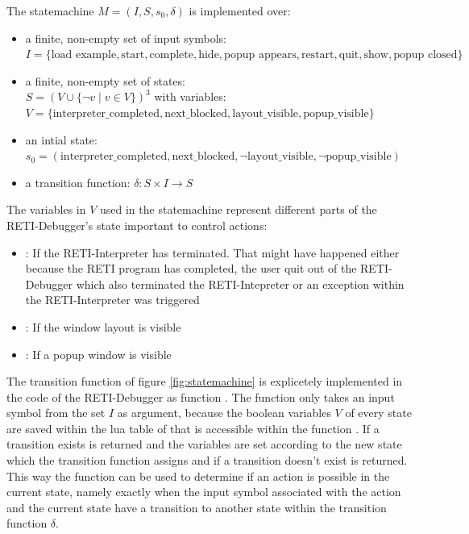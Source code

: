 \documentclass{report}
\begin{document}
The statemachine $M = (I, S, s_0, \delta)$ is implemented over: 

\begin{itemize}
  \item a finite, non-empty set of \alert{input symbols}:\\
    $I = \{\text{load example}, \text{start}, \text{complete}, \text{hide}, \text{popup appears}, \text{restart}, \text{quit}, \text{show}, \text{popup closed}\}$
  \item a finite, non-empty set of \alert{states}:\\
    $S = (V \cup \{\neg v \mid v\in V\})^3$ with \alert{variables}:\\$V = \{\text{interpreter\_completed}, \text{next\_blocked}, \text{layout\_visible}, \text{popup\_visible}\}$
  \item an \alert{intial state}:\\$s_0 = (\text{interpreter\_completed}, \text{next\_blocked}, \neg\text{layout\_visible}, \neg\text{popup\_visible})$
  \item a \alert{transition function}: $\delta: S \times I \rightarrow S$ 
\end{itemize}

The variables in $V$ used in the statemachine represent different parts of the RETI-Debugger's state important to control actions:

\begin{itemize}
  \item {}: If the RETI-Interpreter has terminated. That might have happened either because the RETI program has completed, the user quit out of the RETI-Debugger which also terminated the RETI-Intepreter or an exception within the RETI-Interpreter was triggered
  \item {}: If the window layout is visible
  \item {}: If a popup window is visible
\end{itemize}

The transition function of figure \ref{fig:statemachine} is explicetely implemented in the code of the RETI-Debugger as function . The function only takes an input symbol  from the set $I$ as argument, because the boolean variables $V$ of every state are saved within the lua table of  that is accessible within the function . If a transition exists  is returned and the variables are set according to the new state which the transition function assigns and if a transition doesn't exist  is returned. This way the function  can be used to determine if an action is possible in the current state, namely exactly when the input symbol associated with the action and the current state have a transition to another state within the transition function $\delta$.
\end{document}
